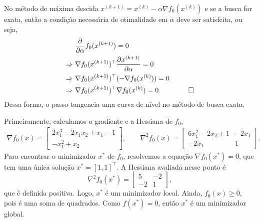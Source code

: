 \begin{questions}
\begin{solution}
	No método de máxima descida $x^{(k+1)} = x^{(k)}-\alpha\nabla f_0(x^{(k)})$ e se a busca for exata, então a condição necessária de otimalidade em $\alpha$ deve ser satisfeita, ou seja,
    \begin{align*}
    					&\frac{\partial}{\partial\alpha} f_0(x^{(k+1)}) = 0 \\
        \Rightarrow~	&\nabla f_0(x^{(k+1)})^\top 
        	\frac{\partial x^{(k+1)}}{\partial\alpha} = 0 \\
        \Rightarrow~	&\nabla f_0(x^{(k+1)})^\top (-\nabla f_0(x^{(k)})) = 0 \\
        \Rightarrow~	&\nabla f_0(x^{(k+1)})^\top \nabla f_0(x^{(k)}) = 0. \qquad\qed
    \end{align*}
    Dessa forma, o passo tangencia uma curva de nível no método de busca exata.
\end{solution}

\begin{solution}
	Primeiramente, calculamos o gradiente e a Hessiana de $f_0$,
    \begin{align*}
    \nabla f_0(x) = 
        \begin{bmatrix}
    		2 x_1^3 - 2 x_1 x_2 + x_1 - 1 \\
            -x_1^2 + x_2
		\end{bmatrix},\qquad
    \nabla^2 f_0(x) = 
        \begin{bmatrix}
    		6 x_1^2 -2 x_2 + 1 & -2 x_1 \\
            -2 x_1  &  1
		\end{bmatrix}.
    \end{align*}
    Para encontrar o minimizador $x^*$ de $f_0$, resolvemos a equação $\nabla f_0(x^*)=0$, que tem uma única solução $x^* = [1,1]^\top$. A Hessiana avaliada nesse ponto é
    \[\nabla^2 f_0(x^*) = 
            \begin{bmatrix}
    		5 	& -2 \\
            -2  &  1
		\end{bmatrix},\]
	que é definida positiva. Logo, $x^*$ é um minimizador local. Ainda, $f_0(x)\ge 0$, pois é uma soma de quadrados. Como $f(x^*)=0$, então $x^*$ é um minimizador global.    
    

\end{solution}
\end{questions}
